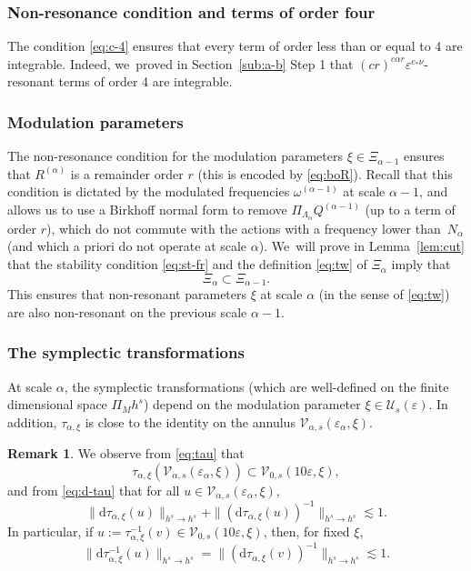 \documentclass[JEP,XML,SOM,Unicode,published]{cedram}
\theoremstyle{plain}
\theoremstyle{definition}
\newtheorem{remark}[theorem]{Remark}
\newcommand{\1}{\mathbf{1}}
\let\epsilon\varepsilon
\begin{document}
\subsubsection*{Non-resonance condition and terms of order four} The condition \eqref{eq:c-4} ensures that every term of order less than or equal to 4 are integrable. Indeed, we~proved in Section~\ref{sub:a-b} Step 1 that $(cr)^{c\alpha r}\epsilon^{c_{\ast}\nu}$-resonant terms of order 4 are integrable.

\subsubsection*{Modulation parameters} The non-resonance condition for the modulation parameters $\xi\in\Xi_{\alpha-1}$ ensures that $R^{(\alpha)}$ is a remainder order $r$ (this is encoded by \eqref{eq:boR}). Recall that this condition is dictated by the modulated frequencies $\omega^{(\alpha-1)}$ at scale $\alpha-1$, and allows us to use a Birkhoff normal form to remove $\Pi_{\Lambda_{\alpha}}Q^{(\alpha-1)}$ (up to a term of order $r$), which do not commute with the actions with a frequency lower than~$N_{\alpha}$ (and which a priori do not operate at scale $\alpha$). We~will prove in Lemma~\ref{lem:cut} that the stability condition \eqref{eq:st-fr} and the definition \eqref{eq:tw} of $\Xi_{\alpha}$ imply that
\[
\Xi_{\alpha} \subset \Xi_{\alpha-1}.
\]
This ensures that non-resonant parameters $\xi$ at scale $\alpha$ (in the sense of \eqref{eq:tw}) are also non-resonant on the previous scale $\alpha-1$.

\subsubsection*{The symplectic transformations} At scale $\alpha$, the symplectic transformations (which are well-defined on the finite dimensional space $\Pi_{M}h^{s}$) depend on the modulation parameter $\xi\in\mathcal{U}_{s}(\epsilon)$. In addition, $\tau_{\alpha,\xi}$ is close to the identity on the annulus $\mathcal{V}_{\alpha,s}(\epsilon_{\alpha},\xi)$.

\begin{remark} We observe from \eqref{eq:tau} that
\[
\tau_{\alpha,\xi}(\mathcal{V}_{\alpha,s}(\epsilon_{\alpha},\xi))\subset \mathcal{V}_{0,s}(10\epsilon,\xi),
\]
and from \eqref{eq:d-tau} that for all $u\in\mathcal{V}_{\alpha,s}(\epsilon_{\alpha},\xi)$,
\[
\|\mathrm{d}\tau_{\alpha,\xi}(u)\|_{h^{s}\to h^{s}}+\|(\mathrm{d}\tau_{\alpha,\xi}(u))^{-1}\|_{h^{s}\to h^{s}} \lesssim1.
\]
In particular, if $u:= \tau_{\alpha,\xi}^{-1}(v) \in \mathcal{V}_{0,s}(10\epsilon,\xi)$, then, for fixed $\xi$,
\begin{equation}
\label{eq:d--1}
\|\mathrm{d}\tau_{\alpha,\xi}^{-1}(u)\|_{h^{s}\to h^{s}}
=
\|(\mathrm{d}\tau_{\alpha,\xi}(v))^{-1}\|_{h^{s}\to h^{s}}
\lesssim1.
\end{equation}
\end{remark}
\end{document}
